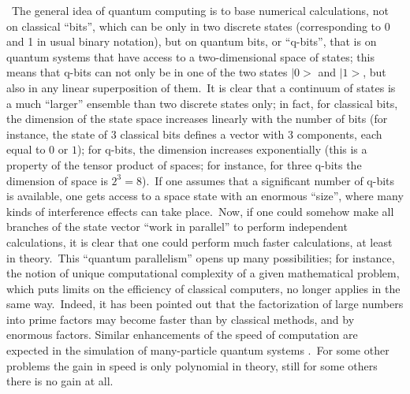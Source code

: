 \documentclass[12pt,onecolumn]{article}%
\begin{document}
\ The general idea of quantum computing \cite{Deutsch} is to base numerical
calculations, not on classical ``bits'', which can be only in two discrete
states (corresponding to 0 and 1 in usual binary notation), but on quantum
bits, or ``q-bits'', that is on quantum systems that have access to a
two-dimensional space of states; this means that q-bits can not only be in one
of the two states $|0>$ and $|1>$, but also in any linear superposition
of them.\ It is clear that a continuum of states is a much ``larger'' ensemble
than two discrete states only; in fact, for classical bits, the dimension of
the state space increases linearly with the number of bits (for instance, the
state of 3 classical bits defines a vector with 3 components, each equal to
$0$ or $1$); for q-bits, the dimension increases exponentially (this is a
property of the tensor product of spaces; for instance, for three q-bits the
dimension of space is $2^{3}=8$).\ If one assumes that a significant number of
q-bits is available, one gets access to a space state with an enormous
``size'', where many kinds of interference effects can take place.\ Now, if
one could somehow make all branches of the state vector ``work in parallel''
to perform independent calculations, it is clear that one could perform much
faster calculations, at least in theory.\ This ``quantum parallelism'' opens
up many possibilities; for instance, the notion of unique computational
complexity of a given mathematical problem, which puts limits on the
efficiency of classical computers, no longer applies in the same way.\ Indeed,
it has been pointed out \cite{Shor} that the factorization of large numbers
into prime factors may become faster than by classical methods, and by
enormous factors. Similar enhancements of the speed of computation are
expected in the simulation of many-particle quantum systems \cite{Abrams}%
.\ For some other problems the gain in speed is only polynomial in theory,
still for some others there is no gain at all.
\end{document}
